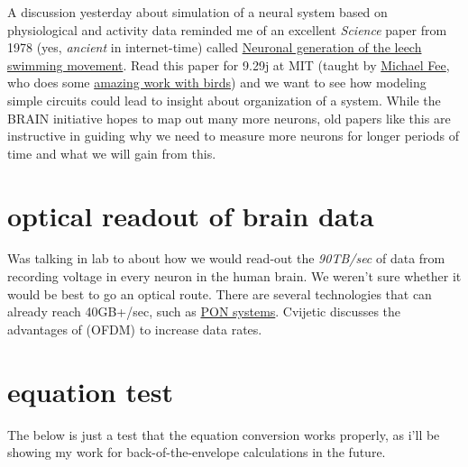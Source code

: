 
		A discussion yesterday about simulation of a neural system based on physiological and activity data reminded me of an excellent \emph{Science} paper from 1978 (yes, \emph{ancient} in internet-time) called \href{http://www.sciencemag.org/content/200/4348/1348.short}{Neuronal generation of the leech swimming movement}.\citep{stent1978neuronal} Read this paper for 9.29j at MIT (taught by \href{http://web.mit.edu/feelab/}{Michael Fee}, who does some \href{http://www.nature.com/nature/journal/v456/n7219/abs/nature07448.html}{amazing work with birds}) and we want to see how modeling simple circuits could lead to insight about organization of a system. While the BRAIN initiative hopes to map out many more neurons, old papers like this are instructive in guiding why we need to measure more neurons for longer periods of time and what we will gain from this.

	\section{optical readout of brain data}
		Was talking in lab to  about how we would read-out the \emph{90TB/sec} of data from recording voltage in every neuron in the human brain. We weren't sure whether it would be best to go an optical route. There are several technologies that can already reach 40GB+/sec, such as \href{http://en.wikipedia.org/wiki/Passive_optical_network}{PON systems}. Cvijetic discusses the advantages of  (OFDM) to increase data rates.\citep{cvijetic2012ofdm}

	\section{equation test}
		The below is just a test that the equation conversion works properly, as i'll be showing my work for back-of-the-envelope calculations in the future.
